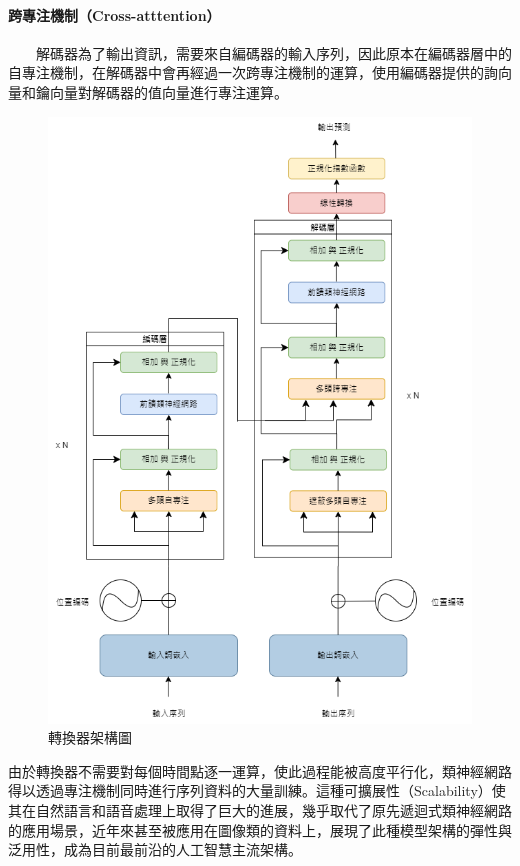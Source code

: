 \paragraph{跨專注機制（Cross-atttention）} \hfill \break
%
　　解碼器為了輸出資訊，需要來自編碼器的輸入序列，因此原本在編碼器層中的自專注機制，在解碼器中會再經過一次跨專注機制的運算，使用編碼器提供的詢向量和鑰向量對解碼器的值向量進行專注運算。
\begin{figure}
    \centering
    \includegraphics[width=0.9\linewidth]{figures/tfm_arch.drawio.png}
    \caption{轉換器架構圖}
    \label{fig:tfm_arch}
\end{figure}
        由於轉換器不需要對每個時間點逐一運算，使此過程能被高度平行化，類神經網路得以透過專注機制同時進行序列資料的大量訓練。這種可擴展性（Scalability）使其在自然語言和語音處理上取得了巨大的進展，幾乎取代了原先遞迴式類神經網路的應用場景，近年來甚至被應用在圖像類的資料上\cite{dosovitskiy2021image}，展現了此種模型架構的彈性與泛用性，成為目前最前沿的人工智慧主流架構。

